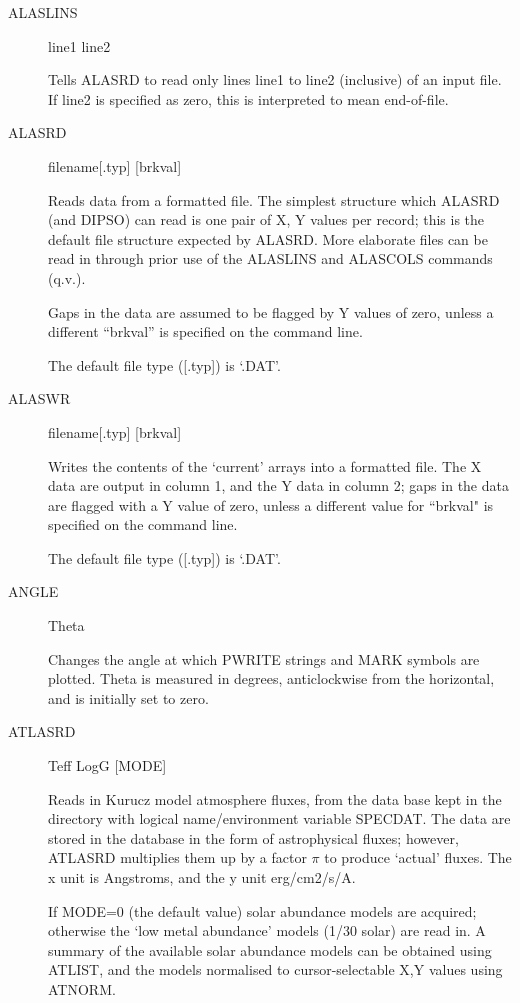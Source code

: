 \begin {description}
\item [ALASLINS] line1 line2

Tells ALASRD to read only lines line1 to line2 (inclusive) of an input
file. If line2 is specified as zero, this is interpreted to mean
end-of-file.

\item [ALASRD] filename[.typ] [brkval]

Reads data from a formatted file. The simplest structure which ALASRD
(and DIPSO) can read is one pair of X, Y values per record;  this is
the default file structure expected by ALASRD. More elaborate files
can be read in through prior use of the ALASLINS and ALASCOLS commands
(q.v.).

Gaps in the data are assumed to be flagged by Y values of zero, unless
a different ``brkval'' is specified on the command line.

The default file type ([.typ]) is `.DAT'.

\item [ALASWR] filename[.typ] [brkval]

Writes the contents of the `current' arrays into a formatted file. The
X data are output in column 1, and the Y data in column 2; gaps in the
data are flagged with a Y value of zero, unless a different value for
``brkval" is specified on the command line.

The default file type ([.typ]) is `.DAT'.

\item [ANGLE] Theta

Changes the angle at which PWRITE strings and MARK symbols are
plotted. Theta is measured in degrees, anticlockwise from the
horizontal, and is initially set to zero.

\item [ATLASRD] Teff LogG [MODE]

Reads in Kurucz model atmosphere fluxes, from the data base kept in
the directory with logical name/environment variable  SPECDAT. The
data are stored in the database in the form of astrophysical fluxes;
however, ATLASRD multiplies them up by a factor $\pi$ to produce
`actual' fluxes. The x unit is Angstroms, and the y unit erg/cm2/s/A.

If MODE=0 (the default value) solar abundance models are acquired;
otherwise the `low metal abundance' models (1/30 solar) are read in. A
summary of the available solar abundance models can be obtained using
ATLIST, and the models normalised to cursor-selectable X,Y values
using ATNORM.


\end{description}
